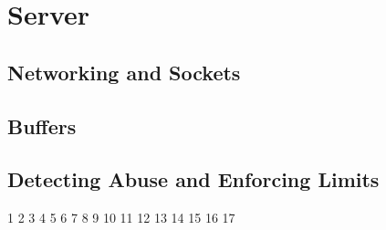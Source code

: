 \section{Server}

\subsection{Networking and Sockets}

\subsection{Buffers}

\subsection{Detecting Abuse and Enforcing Limits}
1
2
3
4
5
6
7
8
9
10
11
12
13
14
15
16
17
